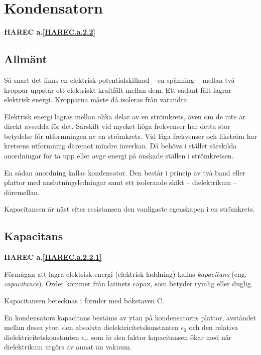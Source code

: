 \section{Kondensatorn}
\textbf{HAREC a.\ref{HAREC.a.2.2}\label{myHAREC.a.2.2}}

\subsection{Allmänt}

Så snart det finns en elektrisk potentialskillnad -- en spänning -- mellan två
kroppar uppstår ett elektriskt kraftfält mellan dem. Ett sådant fält lagrar 
elektrisk energi. Kropparna måste då isoleras från varandra.

Elektrisk energi lagras mellan olika delar av en strömkrets, även om de inte är
direkt avsedda för det. Särskilt vid mycket höga frekvenser har detta stor
betydelse för utformningen av en strömkrets. Vid låga frekvenser och likström
har kretsens utformning däremot mindre inverkan. Då behövs i stället särskilda
anordningar för ta upp eller avge energi på önskade ställen i strömkretsen.

En sådan anordning kallas kondensator. Den består i princip av två band eller
plattor med anslutningsledningar samt ett isolerande skikt -- dielektrikum --
däremellan.

Kapacitansen är näst efter resistansen den vanligaste egenskapen i en
strömkrets.

\subsection{Kapacitans}
\textbf{HAREC a.\ref{HAREC.a.2.2.1}\label{myHAREC.a.2.2.1}}

Förmågan att lagra elektrisk energi (elektrisk laddning) kallas
\emph{kapacitans} (eng. \emph{capacitance}).
Ordet kommer från latinets capax, som betyder rymlig eller duglig.

Kapacitansen betecknas i formler med bokstaven C.

En kondensators kapacitans bestäms av ytan på kondensatorns plattor,
avståndet mellan dessa ytor, den absoluta dielektricitetskonstanten
\(\epsilon_0\) och den relativa dielektricitetskonstanten \(\epsilon_r\), som är
den faktor kapacitansen ökar med när dielektrikum utgörs av annat än vakuum.

